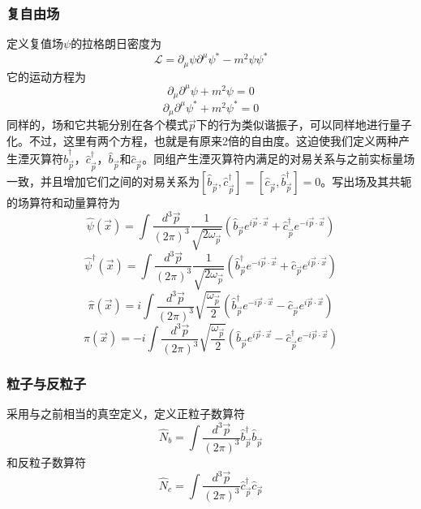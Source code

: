 \documentclass[a4paper,11pt]{ctexart}
\newcommand{\beq}{\begin{equation}}
\newcommand{\eeq}{\end{equation}}
\newcommand{\lag}{\mathcal{L}}
\begin{document}
\subsubsection{复自由场}
定义复值场$\psi$的拉格朗日密度为
\beq
\lag = \partial_\mu \psi \partial^\mu \psi^* - m^2 \psi \psi^*
\eeq
它的运动方程为
\beq
\partial_\mu \partial^\mu \psi + m^2 \psi = 0
\eeq
\beq
\partial_\mu \partial^\mu \psi^* + m^2 \psi^* = 0
\eeq
同样的，场和它共轭分别在各个模式$\vec{p}$下的行为类似谐振子，可以同样地进行量子化。不过，这里有两个方程，也就是有原来2倍的自由度。这迫使我们定义两种产生湮灭算符$\hat{b}_{\vec{p}}^\dagger$，$\hat{c}_{\vec{p}}^\dagger$，$\hat{b}_{\vec{p}}$和$\hat{c}_{\vec{p}}$。同组产生湮灭算符内满足的对易关系与之前实标量场一致，并且增加它们之间的对易关系为$[\hat{b}_{\vec{p}},\hat{c}_{\vec{p}}^\dagger] = [\hat{c}_{\vec{p}},\hat{b}_{\vec{p}}^\dagger] = 0$。写出场及其共轭的场算符和动量算符为
\beq
\hat{\psi}(\vec{x}) = \int \frac{d^3 \vec{p}}{(2\pi)^3} \frac{1}{\sqrt{2 \omega_{\vec{p}}}} (\hat{b}_{\vec{p}} e^{i\vec{p} \cdot \vec{x}} + \hat{c}_{\vec{p}}^\dagger e^{-i\vec{p}\cdot \vec{x}})
\eeq
\beq
\hat{\psi}^\dagger (\vec{x}) = \int \frac{d^3 \vec{p}}{(2\pi)^3} \frac{1}{\sqrt{2 \omega_{\vec{p}}}} (\hat{b}_{\vec{p}}^\dagger e^{-i\vec{p} \cdot \vec{x}} + \hat{c}_{\vec{p}} e^{i\vec{p}\cdot \vec{x}})
\eeq
\beq
\hat{\pi}(\vec{x}) = i \int \frac{d^3\vec{p}}{(2\pi)^3} \sqrt{\frac{\omega_{\vec{p}}}{2}} (\hat{b}_{\vec{p}}^\dagger e^{-i\vec{p} \cdot \vec{x}} - \hat{c}_{\vec{p}} e^{i\vec{p}\cdot \vec{x}})
\eeq
\beq
\hat{\pi}(\vec{x}) = -i \int \frac{d^3\vec{p}}{(2\pi)^3} \sqrt{\frac{\omega_{\vec{p}}}{2}} (\hat{b}_{\vec{p}} e^{i\vec{p} \cdot \vec{x}}  -\hat{c}_{\vec{p}}^\dagger e^{-i\vec{p}\cdot \vec{x}})
\eeq

\subsubsection{粒子与反粒子}
采用与之前相当的真空定义，定义正粒子数算符
\beq
\hat{N}_b = \int \frac{d^3 \vec{p}}{(2\pi)^3}   \hat{b}_{\vec{p}}^\dagger \hat{b}_{\vec{p}}
\eeq
和反粒子数算符
\beq
\hat{N}_c = \int \frac{d^3 \vec{p}}{(2\pi)^3} \hat{c}_{\vec{p}}^\dagger \hat{c}_{\vec{p}}
\eeq
\end{document}
